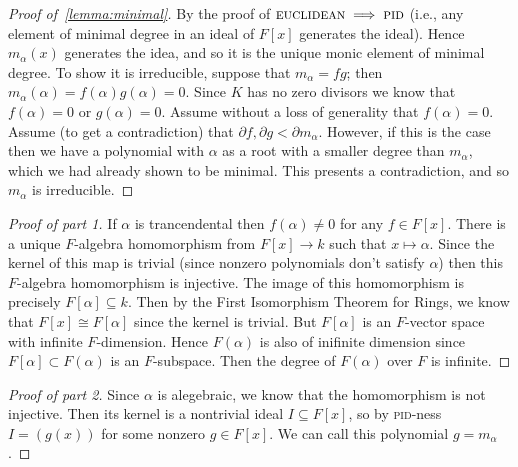 \begin{proof}[Proof of~\ref{lemma:minimal}]
By the proof of $\textsc{euclidean} \implies \textsc{pid}$ (i.e., any element of minimal degree in an ideal of $F[x]$ generates the ideal). Hence $m_\alpha(x)$ generates the idea, and so it is the unique monic element of minimal degree. To show it is irreducible, suppose that $m_\alpha = fg$; then $m_\alpha(\alpha) = f(\alpha)g(\alpha) = 0$. Since $K$ has no zero divisors we know that $f(\alpha) = 0$ or $g(\alpha)=  0$. Assume without a loss of generality that $f(\alpha) = 0$. Assume (to get a contradiction) that $\partial f, \partial g < \partial m_\alpha$. However, if this is the case then we have a polynomial with $\alpha$ as a root with a smaller degree than $m_\alpha$, which we had already shown to be minimal. This presents a contradiction, and so $m_\alpha$ is irreducible.
\end{proof}

\begin{proof}[Proof of part 1]
If $\alpha$ is trancendental then $f(\alpha) \not= 0$ for any $f \in F[x]$.
There is a unique $F$-algebra homomorphism from $F[x] \to k$ such that $x \mapsto \alpha$. Since the kernel of this map is trivial (since nonzero polynomials don't satisfy $\alpha$) then this $F$-algebra homomorphism is injective. The image of this homomorphism is precisely $F[\alpha] \subseteq k$. Then by the First Isomorphism Theorem for Rings, we know that $F[x] \cong F[\alpha]$ since the kernel is trivial. But $F[\alpha]$ is an $F$-vector space with infinite $F$-dimension. Hence $F(\alpha)$ is also of inifinite dimension since $F[\alpha] \subset F(\alpha)$ is an $F$-subspace. Then the degree of $F(\alpha)$ over $F$ is infinite.
\end{proof}

\begin{proof}[Proof of part 2]
Since $\alpha$ is alegebraic, we know that the homomorphism is not injective. Then its kernel is a nontrivial ideal $I \subseteq F[x]$, so by \textsc{pid}-ness $I = (g(x))$ for some nonzero $g \in F[x]$. We can call this polynomial $g = m_\alpha$.
\end{proof}